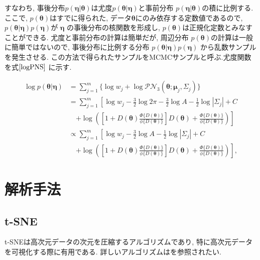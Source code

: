 \documentclass[a4paper,11pt]{jarticle}
\begin{document}
\vspace{-0.5zh}
\noindent
すなわち, 事後分布$p(\bm \eta | \bm \theta)$は尤度$p(\bm \theta | \bm \eta)$と事前分布 $p(\bm \eta| \bm \theta)$の積に比例する. ここで, $p(\bm \theta)$はすでに得られた, データ$\bm \theta$にのみ依存する定数値であるので, $p(\bm \theta | \bm \eta) p(\bm \eta)$が $\bm \eta$  の事後分布の核関数を形成し, $p(\bm \theta)$は正規化定数とみなすことができる. 尤度と事前分布の計算は簡単だが, 周辺分布 $p(\bm \theta)$の計算は一般に簡単ではないので, 事後分布に比例する分布 $p(\bm \theta | \bm \eta) p(\bm \eta)$ から乱数サンプルを発生させる. この方法で得られたサンプルをMCMCサンプルと呼ぶ.尤度関数を式$\ref{logPNS}$ に示す. 

\begin{equation}
\label{logPNS}
\begin{split}
\log p(\bm \theta | \bm \eta) &= \sum^m_{j=1} \{\log w_j + \log \mathcal{PN}_3(\bm \theta;\bm \mu_j, \Sigma_j)\} \\ 
&= \sum^m_{j=1} \left[ \log w_j - \frac{3}{2} \log 2\pi - \frac{3}{2} \log A - \frac{1}{2} \log |\Sigma_j| + C \right. \\
&\quad \left. + \log \left( \left[1 + D(\bm \theta) \frac{\Phi \{D(\bm \theta)\}}{\phi \{D(\bm \theta)\}} \right] D(\bm \theta) + \frac{\Phi \{D(\bm \theta)\}}{\phi \{D(\bm \theta)\}} \right)\right] \\
&\propto \sum^m_{j=1} \left[ \log w_j - \frac{3}{2} \log A - \frac{1}{2} \log |\Sigma_j| + C \right. \\
&\quad \left. + \log \left( \left[1 + D(\bm \theta) \frac{\Phi \{D(\bm \theta)\}}{\phi \{D(\bm \theta)\}} \right] D(\bm \theta) + \frac{\Phi \{D(\bm \theta)\}}{\phi \{D(\bm \theta)\}} \right) \right], 
\end{split}
\end{equation}



\section{解析手法}

\subsection{t-SNE}

t-SNEは高次元データの次元を圧縮するアルゴリズムであり, 特に高次元データを可視化する際に有用である. 詳しいアルゴリズムは\citet{tSNE}を参照されたい.  
\end{document}
